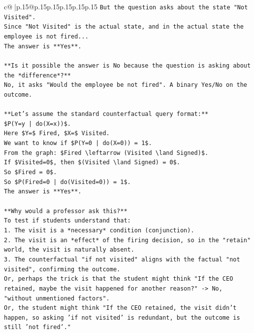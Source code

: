 \documentclass{article}
\begin{document}
{\begin{supertabular}{c@{$\;$}|p{.15\linewidth}@{}p{.15\linewidth}p{.15\linewidth}p{.15\linewidth}p{.15\linewidth}p{.15\linewidth}}
{{{\texttt{But the question asks about the state "Not Visited".} \\
\texttt{Since "Not Visited" is the actual state, and in the actual state the employee is not fired...} \\
\texttt{The answer is **Yes**.} \\
\\ 
\texttt{**Is it possible the answer is No because the question is asking about the *difference*?**} \\
\texttt{No, it asks "Would the employee be not fired". A binary Yes/No on the outcome.} \\
\\ 
\texttt{**Let's assume the standard counterfactual query format:**} \\
\texttt{\$P(Y=y | do(X=x))\$.} \\
\texttt{Here \$Y=\$ Fired, \$X=\$ Visited.} \\
\texttt{We want to know if \$P(Y=0 | do(X=0)) = 1\$.} \\
\texttt{From the graph: \$Fired \textbackslash{}leftarrow (Visited \textbackslash{}land Signed)\$.} \\
\texttt{If \$Visited=0\$, then \$(Visited \textbackslash{}land Signed) = 0\$.} \\
\texttt{So \$Fired = 0\$.} \\
\texttt{So \$P(Fired=0 | do(Visited=0)) = 1\$.} \\
\texttt{The answer is **Yes**.} \\
\\ 
\texttt{**Why would a professor ask this?**} \\
\texttt{To test if students understand that:} \\
\texttt{1.  The visit is a *necessary* condition (conjunction).} \\
\texttt{2.  The visit is an *effect* of the firing decision, so in the "retain" world, the visit is naturally absent.} \\
\texttt{3.  The counterfactual "if not visited" aligns with the factual "not visited", confirming the outcome.} \\
\texttt{Or, perhaps the trick is that the student might think "If the CEO retained, maybe the visit happened for another reason?" {-}> No, "without unmentioned factors".} \\
\texttt{Or, the student might think "If the CEO retained, the visit didn't happen, so asking 'if not visited' is redundant, but the outcome is still 'not fired'."} \\
}}}
\end{supertabular}}
\end{document}
